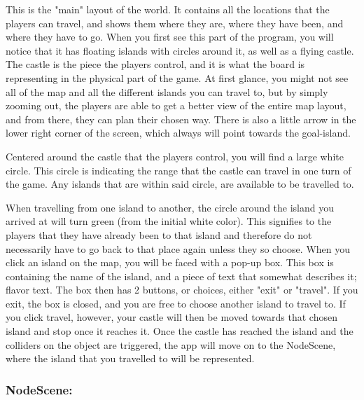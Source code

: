 This is the "main" layout of the world. It contains all the locations that the players can travel, and shows them where they are, where they have been, and where they have to go. When you first see this part of the program, you will notice that it has floating islands with circles around it, as well as a flying castle. The castle is the piece the players control, and it is what the board is representing in the physical part of the game.
At first glance, you might not see all of the map and all the different islands you can travel to, but by simply zooming out, the players are able to get a better view of the entire map layout, and from there, they can plan their chosen way. There is also a little arrow in the lower right corner of the screen, which always will point towards the goal-island. 

Centered around the castle that the players control, you will find a large white circle. This circle is indicating the range that the castle can travel in one turn of the game. Any islands that are within said circle, are available to be travelled to.

When travelling from one island to another, the circle around the island you arrived at will turn green (from the initial white color). This signifies to the players that they have already been to that island and therefore do not necessarily have to go back to that place again unless they so choose. 
When you click an island on the map, you will be faced with a pop-up box. This box is containing the name of the island, and a piece of text that somewhat describes it; flavor text. The box then has 2 buttons, or choices, either "exit" or "travel". If you exit, the box is closed, and you are free to choose another island to travel to. If you click travel, however, your castle will then be moved towards that chosen island and stop once it reaches it. 
Once the castle has reached the island and the colliders on the object are triggered, the app will move on to the NodeScene, where the island that you travelled to will be represented.
\subsubsection{NodeScene:}

